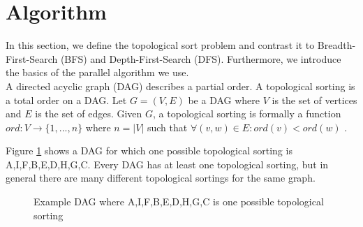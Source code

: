 
\section{Algorithm}\label{sec:background}

 In this section, we define the topological sort problem and contrast it to Breadth-First-Search (BFS) and Depth-First-Search (DFS).
 Furthermore, we introduce the basics of the parallel algorithm we use.
 \\
 

 A directed acyclic graph (DAG) describes a partial order. A topological sorting is a total order on a DAG. Let $G = (V,E)$ be a DAG where $V$ is the set of vertices and $E$ is the set of edges. Given $G$, a topological sorting is formally a function $ord: V \longrightarrow \{1,...,n\}$ where $n = |V|$ such that $\forall (v,w) \in E: ord(v) < ord(w)$ \cite[Chapter~9.1]{ottmann2012algorithmen}.

Figure \ref{fig:ts-example} shows a DAG for which one possible topological sorting is A,I,F,B,E,D,H,G,C. Every DAG has at least one topological sorting, but in general there are many different topological sortings for the same graph.

\begin{figure}[!hbp]
 \centering

\caption{Example DAG where A,I,F,B,E,D,H,G,C is one possible topological sorting}
\label{fig:ts-example}
\end{figure}

